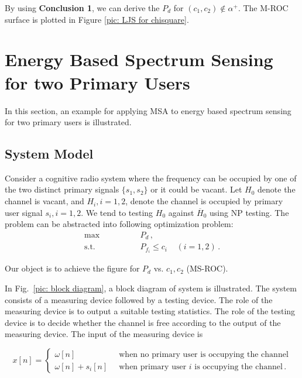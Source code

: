 \documentclass[12pt,journal,a4paper,twoside,onecolumn]{IEEEtran}
\begin{document}
\begin{spacing}{2.5}
By using \textbf{Conclusion 1}, we can derive the $P_d$ for $(c_1, c_2) \notin \alpha^+$.
The M-ROC surface is plotted in Figure \ref{pic: LJS for chisquare}.

\section{Energy Based Spectrum Sensing for two Primary Users}
In this section, an example for applying MSA to energy based spectrum sensing for two primary users is illustrated.

\subsection{System Model}
Consider a cognitive radio system where the frequency can be occupied by one of the two  distinct primary signals $\{ s_1, s_2 \}$ or it could be vacant.
Let  $H_0$  denote the channel is vacant, and $H_i, i = 1, 2$, denote the channel is occupied by primary user signal $s_i, i=1, 2$. We tend  to testing $H_0$ against $\overline{H}_0$ using NP testing. The problem can be abstracted into following optimization problem:
\begin{equation}
  \label{equ: energy spectrum sensing}
  \begin{split}
  \max \;\;\;\;\;\;\;\;\;\;\;\;\;\;\; &P_d\,,\\
  \text{s.t.} \;\;\;\;\;\;\;\;\;\;\;\;\;\;\; &P_{f_i} \leq c_i\;\;\;\;(i = 1, 2)\,.
  \end{split}
\end{equation}

Our object is to achieve the figure for $P_d$ vs. $c_1, c_2$ (MS-ROC).

In Fig.~\ref{pic: block diagram}, a block diagram of system is illustrated.  The system consists of a measuring device followed by a testing device. The role of the measuring device is to output a suitable testing statistics. The role of the testing device is to decide whether the channel is free according to  the output of the measuring device. The input of the measuring device is

\begin{equation}
  \label{equ: expression of x}
  x[n]=\begin{cases}
    \omega[n]\;\;\;\;\;\;\;\;\;\;\;\;\;\;&\text{when no primary user is occupying the channel}\\
    \omega[n] + s_i[n]\;\;&\text{when primary user $i$ is occupying the channel}\,.
  \end{cases}
\end{equation}


\end{spacing}
\end{document}
